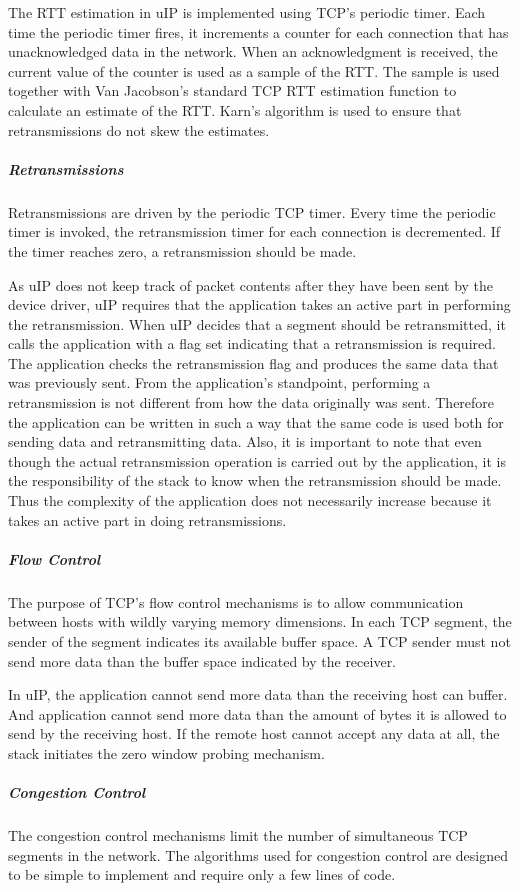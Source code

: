 \-The \-R\-T\-T estimation in u\-I\-P is implemented using \-T\-C\-P's periodic timer. \-Each time the periodic timer fires, it increments a counter for each connection that has unacknowledged data in the network. \-When an acknowledgment is received, the current value of the counter is used as a sample of the \-R\-T\-T. \-The sample is used together with \-Van \-Jacobson's standard \-T\-C\-P \-R\-T\-T estimation function to calculate an estimate of the \-R\-T\-T. \-Karn's algorithm is used to ensure that retransmissions do not skew the estimates.\hypertarget{a00060_rexmit}{}\subparagraph{\-Retransmissions}\label{a00060_rexmit}
\-Retransmissions are driven by the periodic \-T\-C\-P timer. \-Every time the periodic timer is invoked, the retransmission timer for each connection is decremented. \-If the timer reaches zero, a retransmission should be made.

\-As u\-I\-P does not keep track of packet contents after they have been sent by the device driver, u\-I\-P requires that the application takes an active part in performing the retransmission. \-When u\-I\-P decides that a segment should be retransmitted, it calls the application with a flag set indicating that a retransmission is required. \-The application checks the retransmission flag and produces the same data that was previously sent. \-From the application's standpoint, performing a retransmission is not different from how the data originally was sent. \-Therefore the application can be written in such a way that the same code is used both for sending data and retransmitting data. \-Also, it is important to note that even though the actual retransmission operation is carried out by the application, it is the responsibility of the stack to know when the retransmission should be made. \-Thus the complexity of the application does not necessarily increase because it takes an active part in doing retransmissions.\hypertarget{a00060_flowcontrol}{}\subparagraph{\-Flow Control}\label{a00060_flowcontrol}
\-The purpose of \-T\-C\-P's flow control mechanisms is to allow communication between hosts with wildly varying memory dimensions. \-In each \-T\-C\-P segment, the sender of the segment indicates its available buffer space. \-A \-T\-C\-P sender must not send more data than the buffer space indicated by the receiver.

\-In u\-I\-P, the application cannot send more data than the receiving host can buffer. \-And application cannot send more data than the amount of bytes it is allowed to send by the receiving host. \-If the remote host cannot accept any data at all, the stack initiates the zero window probing mechanism.\hypertarget{a00060_congestioncontrol}{}\subparagraph{\-Congestion Control}\label{a00060_congestioncontrol}
\-The congestion control mechanisms limit the number of simultaneous \-T\-C\-P segments in the network. \-The algorithms used for congestion control are designed to be simple to implement and require only a few lines of code.

